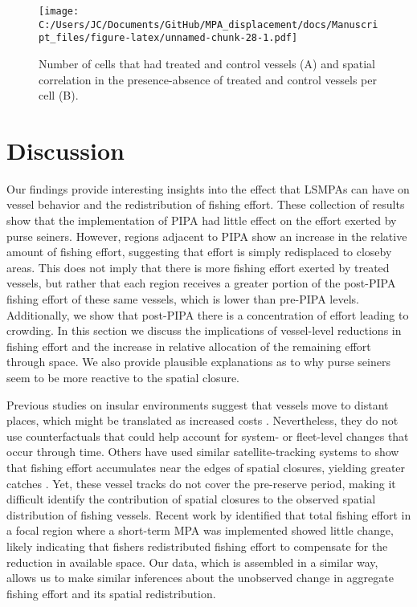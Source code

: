 \documentclass[11pt,]{article}
\begin{document}
\begin{figure}
\centering
\texttt{[image: C:/Users/JC/Documents/GitHub/MPA\_displacement/docs/Manuscript\_files/figure-latex/unnamed-chunk-28-1.pdf]}
\caption{\label{fig:unnamed-chunk-28}\label{fig:sp_corr}Number of cells that
had treated and control vessels (A) and spatial correlation in the
presence-absence of treated and control vessels per cell (B).}
\end{figure}

\clearpage

\hypertarget{discussion}{%
\section{Discussion}\label{discussion}}

Our findings provide interesting insights into the effect that LSMPAs
can have on vessel behavior and the redistribution of fishing effort.
These collection of results show that the implementation of PIPA had
little effect on the effort exerted by purse seiners. However, regions
adjacent to PIPA show an increase in the relative amount of fishing
effort, suggesting that effort is simply redisplaced to closeby areas.
This does not imply that there is more fishing effort exerted by treated
vessels, but rather that each region receives a greater portion of the
post-PIPA fishing effort of these same vessels, which is lower than
pre-PIPA levels. Additionally, we show that post-PIPA there is a
concentration of effort leading to crowding. In this section we discuss
the implications of vessel-level reductions in fishing effort and the
increase in relative allocation of the remaining effort through space.
We also provide plausible explanations as to why purse seiners seem to
be more reactive to the spatial closure.

Previous studies on insular environments suggest that vessels move to
distant places, which might be translated as increased costs
\citep{stevenson_2013}. Nevertheless, they do not use counterfactuals
that could help account for system- or fleet-level changes that occur
through time. Others have used similar satellite-tracking systems to
show that fishing effort accumulates near the edges of spatial closures,
yielding greater catches \citep{murawski_2005}. Yet, these vessel tracks
do not cover the pre-reserve period, making it difficult identify the
contribution of spatial closures to the observed spatial distribution of
fishing vessels. Recent work by \citet{elahi_2018} identified that total
fishing effort in a focal region where a short-term MPA was implemented
showed little change, likely indicating that fishers redistributed
fishing effort to compensate for the reduction in available space. Our
data, which is assembled in a similar way, allows us to make similar
inferences about the unobserved change in aggregate fishing effort and
its spatial redistribution.
\end{document}

